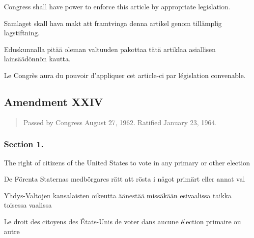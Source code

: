 \documentclass[a4paper,landscape,12pt]{article}
\begin{document}
\begin{minipage}[t]{0.22\textwidth}
	Congress shall have power to enforce this article by appropriate legislation.
\end{minipage}\textwidth
\begin{minipage}[t]{0.22\textwidth}
	Samlaget skall hava makt att framtvinga denna artikel genom tillämplig lagstiftning.
\end{minipage}\textwidth
\begin{minipage}[t]{0.22\textwidth}
	Eduskunnalla pitää oleman valtuuden pakottaa tätä artiklaa asiallisen lainsäädönnön kautta.
\end{minipage}\textwidth
\begin{minipage}[t]{0.22\textwidth}
Le Congrès aura du pouvoir d'appliquer cet article-ci par législation convenable.
\end{minipage}

\subsection*{Amendment XXIV}
\begin{quote}\small
Passed by Congress August 27, 1962. Ratified January 23, 1964.
\end{quote}
\subsubsection*{Section 1.}
\begin{minipage}[t]{0.22\textwidth}
	The right of citizens of the United States to vote in any primary or other election
\end{minipage}\textwidth
\begin{minipage}[t]{0.22\textwidth}
	De Förenta Staternas medbörgares rätt att rösta i något primärt eller annat val
\end{minipage}\textwidth
\begin{minipage}[t]{0.22\textwidth}
	Yhdys-Valtojen kansalaisten oikeutta äänestää missäkään esivaalissa taikka toisessa vaalissa
\end{minipage}\textwidth
\begin{minipage}[t]{0.22\textwidth}
	Le droit des citoyens des États-Unis de voter dans aucune élection primaire ou autre
	\end{minipage}
\end{document}
